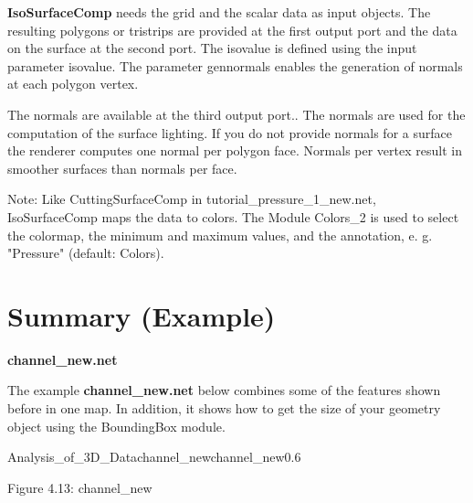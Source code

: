 {\bf IsoSurfaceComp} needs the grid and the scalar data as input objects. The resulting
polygons or tristrips are provided at the first output port and the data on the surface 
at the second port. The isovalue is defined using the input parameter isovalue. 
The parameter gennormals enables the generation of normals at each polygon
vertex. 

The normals are available at the third output port.. The normals are used for the computation of the surface 
lighting. If you do not provide normals for a surface the renderer computes one normal 
per polygon face. Normals per vertex result in smoother surfaces than normals per face.

Note: Like CuttingSurfaceComp in tutorial\_pressure\_1\_new.net, IsoSurfaceComp maps the data to
colors. The Module Colors\_2 is used to select the colormap, the minimum and maximum
values, and the annotation, e. g. "Pressure" (default: Colors). 

\clearpage
\section{Summary (Example)}

\begin{Large}{\bf channel\_new.net}\end{Large}
\vspace{0.5cm}

The example {\bf channel\_new.net} below combines some of the features shown before in one map. In
addition, it shows how to get the size of your geometry object using the BoundingBox
module.
 
\begin{covimg}{Analysis_of_3D_Data}{channel_new}{channel\_new}{0.6}\end{covimg}
\begin{htmlonly}
Figure 4.13: channel_new
\vspace{0.5cm}
\end{htmlonly}

